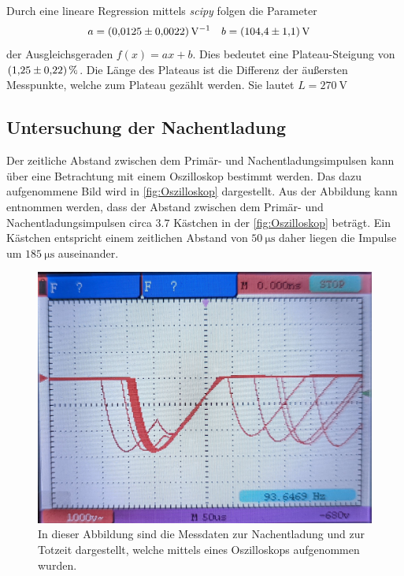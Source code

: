 Durch eine lineare Regression mittels \textit{scipy} \cite{scipy} folgen die Parameter
\begin{align*}
  a &= \qty{0.0125+-0.0022}{\volt^{-1}} & b &= \qty{104.4+-1.1}{\volt}
\end{align*}
der Ausgleichsgeraden $f(x) = ax + b$. Dies bedeutet eine Plateau-Steigung von $\qty{1.25+-0.22}{\percent}$. Die Länge des Plateaus ist die Differenz der äußersten Messpunkte,
welche zum Plateau gezählt werden. Sie lautet $L = \qty{270}{\volt}$

\subsection{Untersuchung der Nachentladung}
\label{subsec:Nachentladung}
Der zeitliche Abstand zwischen dem Primär- und Nachentladungsimpulsen kann über eine Betrachtung mit einem Oszilloskop bestimmt werden. Das dazu aufgenommene Bild wird in 
\autoref{fig:Oszilloskop} dargestellt. Aus der Abbildung kann entnommen werden, dass der Abstand zwischen dem Primär- und Nachentladungsimpulsen circa $\num{3.7}$ Kästchen 
in der \autoref{fig:Oszilloskop} beträgt. Ein Kästchen entspricht einem zeitlichen Abstand von $\qty{50}{\micro\second}$ daher liegen die Impulse um $\qty{185}{\micro\second}$
auseinander.
\begin{figure}
  \centering
  \includegraphics[width = .8\textwidth]{content/Oszilloskop_bild.jpg}
  \caption{In dieser Abbildung sind die Messdaten zur Nachentladung und zur Totzeit dargestellt, welche mittels eines Oszilloskops aufgenommen wurden.}
  \label{fig:Oszilloskop}
\end{figure}

